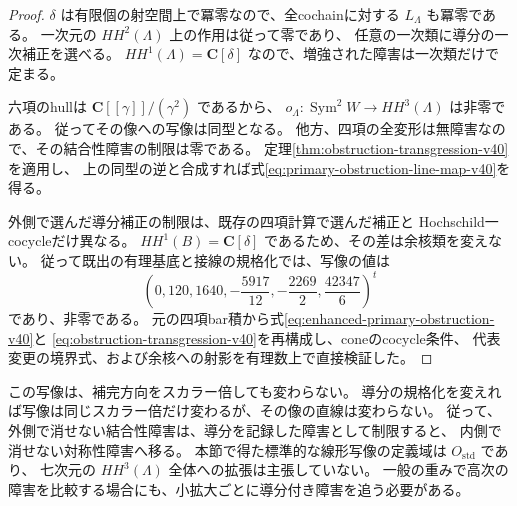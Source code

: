\begin{proof}
$\delta$ は有限個の射空間上で冪零なので、全cochainに対する $L_\Lambda$ も冪零である。
一次元の $HH^2(\Lambda)$ 上の作用は従って零であり、
任意の一次類に導分の一次補正を選べる。
$HH^1(\Lambda)=\mathbf C[\delta]$ なので、増強された障害は一次類だけで定まる。

六項のhullは $\mathbf C[[\gamma]]/(\gamma^2)$ であるから、
$o_\Lambda:\operatorname{Sym}^2W\to HH^3(\Lambda)$ は非零である。
従ってその像への写像は同型となる。
他方、四項の全変形は無障害なので、その結合性障害の制限は零である。
定理\ref{thm:obstruction-transgression-v40}を適用し、
上の同型の逆と合成すれば式\eqref{eq:primary-obstruction-line-map-v40}を得る。

外側で選んだ導分補正の制限は、既存の四項計算で選んだ補正と
Hochschild一cocycleだけ異なる。
$HH^1(B)=\mathbf C[\delta]$ であるため、その差は余核類を変えない。
従って既出の有理基底と接線の規格化では、写像の値は
\[
 \left(0,120,1640,-\frac{5917}{12},-\frac{2269}{2},
                    \frac{42347}{6}\right)^t
\]
であり、非零である。
元の四項bar積から式\eqref{eq:enhanced-primary-obstruction-v40}と
\eqref{eq:obstruction-transgression-v40}を再構成し、coneのcocycle条件、
代表変更の境界式、および余核への射影を有理数上で直接検証した。
\end{proof}

この写像は、補完方向をスカラー倍しても変わらない。
導分の規格化を変えれば写像は同じスカラー倍だけ変わるが、その像の直線は変わらない。
従って、外側で消せない結合性障害は、導分を記録した障害として制限すると、
内側で消せない対称性障害へ移る。
本節で得た標準的な線形写像の定義域は $O_{\mathrm{std}}$ であり、
七次元の $HH^3(\Lambda)$ 全体への拡張は主張していない。
一般の重みで高次の障害を比較する場合にも、小拡大ごとに導分付き障害を追う必要がある。
